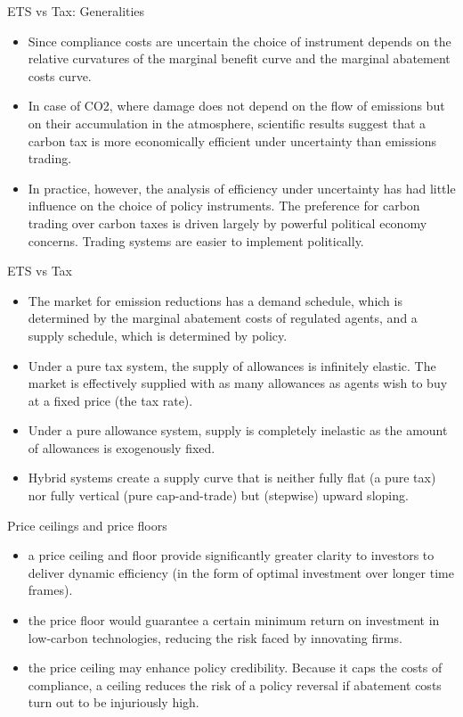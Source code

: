 {ETS vs Tax: Generalities}
\begin{itemize}
\item<1-> Since compliance costs are uncertain the choice of instrument depends on the relative curvatures
of the marginal benefit curve and the marginal abatement costs curve.
\item<2-> In case of CO2, where damage does not depend on the flow of emissions but on their accumulation in
the atmosphere, scientific results suggest that a carbon tax is more economically efficient under
uncertainty than emissions trading.
\item<3-> In practice, however, the analysis of efficiency
under uncertainty has had little influence on the choice of policy instruments. The preference
for carbon trading over carbon taxes is driven largely by powerful political economy concerns.
Trading systems are easier to implement politically.
  \end{itemize}



{ETS vs Tax}
\begin{itemize}
\item<1-> The market for emission
reductions has a demand schedule, which is determined by the marginal abatement costs of
regulated agents, and a supply schedule, which is determined by policy.
\item<2-> Under a pure tax
system, the supply of allowances is infinitely elastic. The market is effectively supplied with as
many allowances as agents wish to buy at a fixed price (the tax rate).
\item<3-> Under a pure allowance
system, supply is completely inelastic as the amount of allowances is exogenously fixed.
\item<4-> Hybrid systems create a supply curve that is neither fully flat (a pure tax) nor fully vertical
(pure cap-and-trade) but (stepwise) upward sloping.
\end{itemize}




{Price ceilings and price floors}
\begin{itemize}
\item<1-> a price ceiling and floor provide significantly
greater clarity to investors to deliver dynamic efficiency (in the form of optimal investment
over longer time frames).
\item<2-> the price floor would guarantee a certain minimum return on
investment in low-carbon technologies, reducing the risk faced by innovating firms.
\item<3-> the price ceiling may enhance policy credibility. Because it caps the costs of
compliance, a ceiling reduces the risk of a policy reversal if abatement costs turn out to be
injuriously high.
\end{itemize}



